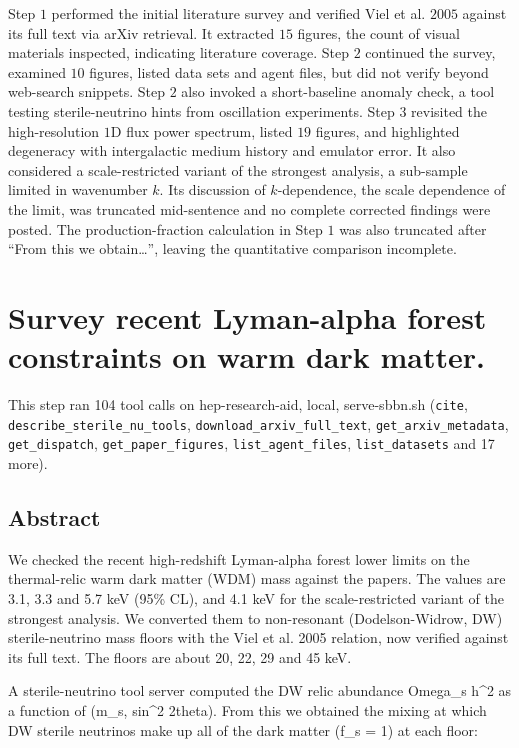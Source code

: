 \documentclass[11pt,a4paper]{article}
\begin{document}
Step $1$ performed the initial literature survey and verified Viel et al. $2005$ against its full text via arXiv retrieval. It extracted $15$ figures, the count of visual materials inspected, indicating literature coverage. Step $2$ continued the survey, examined $10$ figures, listed data sets and agent files, but did not verify beyond web-search snippets. Step $2$ also invoked a short-baseline anomaly check, a tool testing sterile-neutrino hints from oscillation experiments. Step $3$ revisited the high-resolution $1$D flux power spectrum, listed $19$ figures, and highlighted degeneracy with intergalactic medium history and emulator error. It also considered a scale-restricted variant of the strongest analysis, a sub-sample limited in wavenumber $k$. Its discussion of $k$-dependence, the scale dependence of the limit, was truncated mid-sentence and no complete corrected findings were posted. The production-fraction calculation in Step $1$ was also truncated after ``From this we obtain\ldots{}'', leaving the quantitative comparison incomplete.

\section{Survey recent Lyman-alpha forest constraints on warm dark matter.}
This step ran 104 tool calls on hep-research-aid, local, serve-sbbn.sh (\texttt{cite}, \texttt{describe\_sterile\_nu\_tools}, \texttt{download\_arxiv\_full\_text}, \texttt{get\_arxiv\_metadata}, \texttt{get\_dispatch}, \texttt{get\_paper\_figures}, \texttt{list\_agent\_files}, \texttt{list\_datasets} and 17 more).\par
\subsection{Abstract}
We checked the recent high-redshift Lyman-alpha forest lower limits on the thermal-relic warm dark matter (WDM) mass against the papers. The values are 3.1, 3.3 and 5.7 keV (95\% CL), and 4.1 keV for the scale-restricted variant of the strongest analysis. We converted them to non-resonant (Dodelson-Widrow, DW) sterile-neutrino mass floors with the Viel et al. 2005 relation, now verified against its full text. The floors are about 20, 22, 29 and 45 keV.

A sterile-neutrino tool server computed the DW relic abundance Omega\_s h\textasciicircum{}2 as a function of (m\_s, sin\textasciicircum{}2 2theta). From this we obtained the mixing at which DW sterile neutrinos make up all of the dark matter (f\_s = 1) at each floor:
\end{document}
